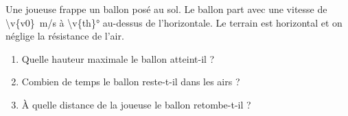 Une joueuse frappe un ballon posé au sol. Le ballon part avec une vitesse de \qty{\v{v0}}{m/s} à \ang{\v{th}} au-dessus de l'horizontale. Le terrain est horizontal et on néglige la résistance de l'air.

\begin{enumerate}[label=\alph*)]
    \item Quelle hauteur maximale le ballon atteint-il ?
    \item Combien de temps le ballon reste-t-il dans les airs ?
    \item À quelle distance de la joueuse le ballon retombe-t-il ?
\end{enumerate}
